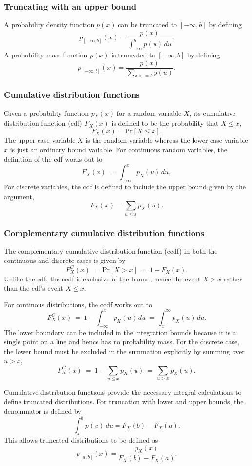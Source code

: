 \subsubsection{Truncating with an upper bound}

A probability density function $p(x)$ can be truncated to $[-\infty, b]$ by
defining
%
\[
p_{[-\infty,b]}(x)
= \frac{p(x)}
       {\int_{-\infty}^b p(u) \, du}.
\]
%
A probability mass function $p(x)$ is truncated to $[-\infty, b]$ by
defining 
%
\[
p_{[-\infty,b]}(x) = \frac{p(x)}
                  {\sum_{u <= b} p(u)}.
\]


\subsubsection{Cumulative distribution functions}

Given a probability function $p_X(x)$ for a random variable $X$, its
cumulative distribution function (cdf) $F_X(x)$ is defined to be the
probability that $X \leq x$,
%
\[
F_X(x) = \mbox{Pr}[X \leq x].
\]
The upper-case variable $X$ is the random variable whereas the
lower-case variable $x$ is just an ordinary bound variable.  For
continuous random variables, the definition of the cdf works out to
\[
F_X(x) \ = \ \int_{-\infty}^{x} p_X(u) \, du,
\]
For discrete variables, the cdf is defined to include the upper bound
given by the argument,
\[
F_X(x) = \sum_{u \leq x} p_X(u).
\]
%

\subsubsection{Complementary cumulative distribution functions}

The complementary cumulative distribution function (ccdf) in both the
continuous and discrete cases is given by
\[
F^C_X(x)
\ = \ \mbox{Pr}[X > x]
\ = \ 1 - F_X(x).
\]
Unlike the cdf, the ccdf is exclusive of the bound, hence the event
$X > x$ rather than the cdf's event $X \leq x$.

For continous distributions, the ccdf works out to 
\[
F^C_X(x)
\ = \ 1 - \int_{-\infty}^x p_X(u) \, du
\ = \ \int_x^{\infty} p_X(u) \, du.
\]
The lower boundary can be included in the integration bounds because
it is a single point on a line and hence has no probability mass.
For the discrete case, the lower bound must be excluded in the
summation explicitly by summing over $u > x$,
\[
F^C_X(x)
\ = \ 1 - \sum_{u \leq x} p_X(u)
\ = \ \sum_{u > x} p_X(u).
\]


Cumulative distribution functions provide the necessary integral
calculations to define truncated distributions.  For truncation with
lower and upper bounds, the denominator is defined by
\[
\int_a^b p(u) \, du = F_X(b) - F_X(a).
\]
This allows truncated distributions to be defined as
\[
p_{[a,b]}(x) = \frac{p_X(x)}
                  {F_X(b) - F_X(a)}.
\]

